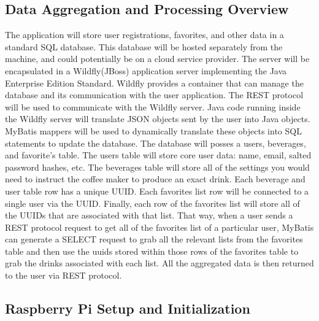 \documentclass[conference]{IEEEtran}
\begin{document}
\subsection{Data Aggregation and Processing Overview}
The application will store user registrations, favorites, and other data in a
standard SQL database. This database will be hosted separately from the
machine, and could potentially be on a cloud service provider. The server will
be encapsulated in a Wildfly(JBoss) application server implementing the Java
Enterprise Edition Standard. Wildfly provides a container that can manage the
database and its communication with the user application. The REST protocol
will be used to communicate with the Wildfly server. Java code running inside
the Wildfly server will translate JSON objects sent by the user into Java
objects. MyBatis mappers will be used to dynamically translate these objects
into SQL statements to update the database. The database will posses a users,
beverages, and favorite's table. The users table will store core user data:
name, email, salted password hashes, etc. The beverages table will store all of
the settings you would need to instruct the coffee maker to produce an exact
drink. Each beverage and user table row has a unique UUID. Each favorites list
row will be connected to a single user via the UUID. Finally, each row of the
favorites list will store all of the UUIDs that are associated with that list.
That way, when a user sends a REST protocol request to get all of the favorites
list of a particular user, MyBatis can generate a SELECT request to grab all
the relevant lists from the favorites table and then use the uuids stored
within those rows of the favorites table to grab the drinks associated with
each list. All the aggregated data is then returned to the user via REST protocol.

\subsection{Raspberry Pi Setup and Initialization}


\end{document}
